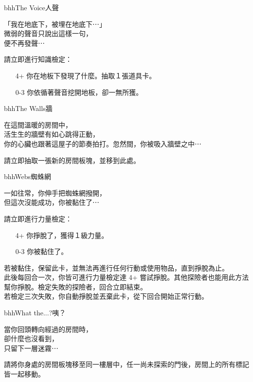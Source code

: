 \linebreak[0]%
\begin{EventCard}{bhh}{The Voice}{人聲}
  \begin{CardStory}
    「我在地底下，被埋在地底下⋯」\\
    微弱的聲音只說出這樣一句，\\
    便不再發聲⋯
  \end{CardStory}
  請立即進行知識檢定：
  \begin{itemize}
    \item[4+] 你在地板下發現了什麼。抽取１張道具卡。
    \item[0-3] 你依循著聲音挖開地板，卻一無所獲。
  \end{itemize}
\end{EventCard}%
\linebreak[0]%
\begin{EventCard}{bhh}{The Walls}{牆}
  \begin{CardStory}
    在這間溫暖的房間中，\\
    活生生的牆壁有如心跳得正動，\\
    你的心臟也跟著這屋子的節奏拍打。忽然間，你被吸入牆壁之中⋯
  \end{CardStory}
  請立即抽取一張新的房間板塊，並移到此處。\\[0.5em]
\end{EventCard}%
\linebreak[0]%
\begin{EventCard}{bhh}{Webs}{蜘蛛網}
  \begin{CardStory}
    一如往常，你伸手把蜘蛛網撥開，\\
    但這次沒能成功，你被黏住了⋯
  \end{CardStory}
  請立即進行力量檢定：
  \begin{itemize}
    \item[4+] 你掙脫了，獲得１級力量。
    \item[0-3] 你被黏住了。
  \end{itemize}
  若被黏住，保留此卡，並無法再進行任何行動或使用物品，直到掙脫為止。\\[0.5em]
  此後每回合一次，你皆可進行力量檢定達 4+ 嘗試掙脫。其他探險者也能用此方法幫你掙脫。檢定失敗的探險者，回合立即結束。\\[0.5em]
  若檢定三次失敗，你自動掙脫並丟棄此卡，從下回合開始正常行動。\\[0.5em]
\end{EventCard}%
\linebreak[0]%
\begin{EventCard}{bhh}{What the...?}{咦？}
  \begin{CardStory}
    當你回頭轉向經過的房間時，\\
    卻什麼也沒看到，\\
    只留下一層迷霧⋯
  \end{CardStory}
  請將你身處的房間板塊移至同一樓層中，任一尚未探索的門後，房間上的所有標記皆一起移動。\\[0.5em]
\end{EventCard}%
